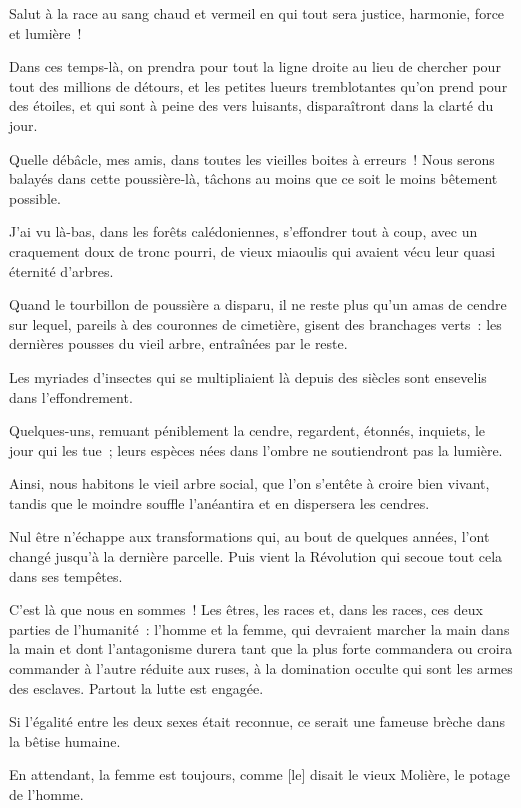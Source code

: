 \documentclass[french,twoside]{book} %
\newcommand\corr[1]{#1}
\begin{document}
 Salut à la race au sang chaud et vermeil en qui tout sera justice, harmonie, force et lumière !\par
Dans ces temps-là, on prendra pour tout la ligne droite au lieu de chercher pour tout des millions de détours, et les petites lueurs tremblotantes qu’on prend pour des étoiles, et qui sont à peine des vers luisants, disparaîtront dans la clarté du jour.\par
Quelle débâcle, mes amis, dans toutes les vieilles boites à erreurs ! Nous serons balayés dans cette poussière-là, tâchons au moins que ce soit le moins bêtement possible.\par
J’ai vu là-bas, dans les forêts calédoniennes, s’effondrer tout à coup, avec un craquement doux de tronc pourri, de vieux miaoulis qui avaient vécu leur quasi éternité d’arbres.\par
Quand le tourbillon de poussière a disparu, il ne reste plus qu’un amas de cendre sur lequel, pareils à des couronnes de cimetière, gisent des branchages verts : les dernières pousses du vieil arbre, entraînées par le reste.\par
Les myriades d’insectes qui se multipliaient là depuis des siècles sont ensevelis dans l’effondrement.\par
Quelques-uns, remuant péniblement la cendre, regardent, étonnés, inquiets, le jour qui les tue ;  leurs espèces nées dans l’ombre ne soutiendront pas la lumière.\par
Ainsi, nous habitons le vieil arbre social, que l’on s’entête à croire bien vivant, tandis que le moindre souffle l’anéantira et en dispersera les cendres.\par
Nul être n’échappe aux transformations qui, au bout de quelques années, l’ont changé jusqu’à la dernière parcelle. Puis vient la Révolution qui secoue tout cela dans ses tempêtes.\par
C’est là que nous en sommes ! Les êtres, les races et, dans les races, ces deux parties de l’humanité : l’homme et la femme, qui devraient marcher la main dans la main et dont l’antagonisme durera tant que la plus forte commandera ou croira commander à l’autre réduite aux ruses, à la domination occulte qui sont les armes des esclaves. Partout la lutte est engagée.\par
Si l’égalité entre les deux sexes était reconnue, ce serait une fameuse brèche dans la bêtise humaine.\par
En attendant, la femme est toujours, comme [{\corr le}] disait le vieux Molière, le potage de l’homme.\par
\end{document}
